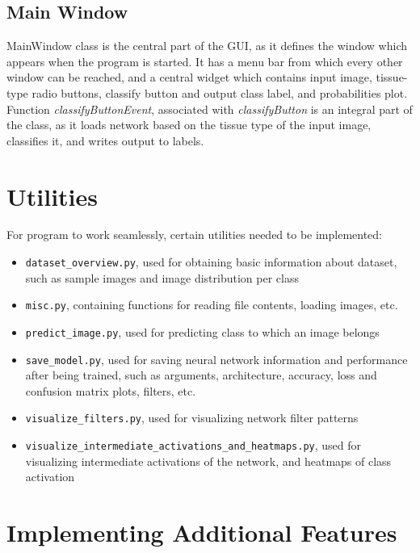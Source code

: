 \subsection{Main Window}

MainWindow class is the central part of the GUI, as it defines the window which appears when the program is started. It has a menu bar from which every other window can be reached, and a central widget which contains input image, tissue-type radio buttons, classify button and output class label, and probabilities plot. Function \emph{classifyButtonEvent}, associated with \emph{classifyButton} is an integral part of the class, as it loads network based on the tissue type of the input image, classifies it, and writes output to labels.


\section{Utilities}
\label{utils}

For program to work seamlessly, certain utilities needed to be implemented:
\begin{itemize}
	\itemsep 0em
	\item \texttt{dataset\_overview.py}, used for obtaining basic information about dataset, such as sample images and image distribution per class
	\item \texttt{misc.py}, containing functions for reading file contents, loading images, etc. 
	\item \texttt{predict\_image.py}, used for predicting class to which an image belongs
	\item \texttt{save\_model.py}, used for saving neural network information and performance after being trained, such as arguments, architecture, accuracy, loss and confusion matrix plots, filters, etc.  
	\item \texttt{visualize\_filters.py}, used for visualizing network filter patterns
	\item \texttt{visualize\_intermediate\_activations\_and\_heatmaps.py}, used for visualizing intermediate activations of the network, and heatmaps of class activation
\end{itemize}

\section{Implementing Additional Features}

